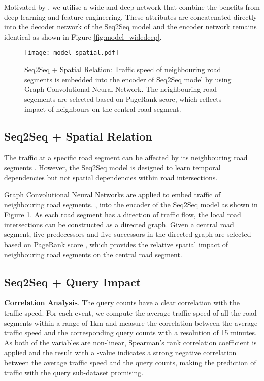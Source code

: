 Motivated by \cite{cheng2016wide}, we utilise a wide and deep network that combine the benefits from deep learning and feature engineering. These attributes  are concatenated directly into the decoder network of the Seq2Seq model and the encoder network remains identical as shown in Figure  \ref{fig:model_widedeep}.


\begin{figure}[htbp]
\centering
\texttt{[image: model\_spatial.pdf]}
\caption{Seq2Seq + Spatial Relation: Traffic speed of neighbouring road segments  is embedded into the encoder of Seq2Seq model by using Graph Convolutional Neural Network. The neighbouring road segements are selected based on PageRank score, which reflects impact of neighbours on the central road segment.}
\label{fig:model_spatial}
\end{figure}


\subsection{Seq2Seq + Spatial Relation}

The traffic at a specific road segment can be affected by its neighbouring road segments  \cite{yu2017spatio}. However, the Seq2Seq model is designed to learn temporal dependencies but not spatial dependencies within road intersections. 

Graph Convolutional Neural Networks \cite{niepert2016learning} are applied to embed traffic of neighbouring road segments, , into the encoder of the Seq2Seq model as shown in Figure \ref{fig:model_spatial}. As each road segment has a direction of traffic flow, the local road intersections can be constructed as a directed graph. Given a central road segment, five predecessors and five successors in the directed graph are selected based on PageRank score \cite{page1999pagerank}, which provides the relative spatial impact of neighbouring road segments on the central road segment.



\subsection{Seq2Seq + Query Impact}

\textbf{Correlation Analysis}. The query counts have a clear correlation with the traffic speed. For each event, we compute the average traffic speed of all the road segments within a range of 1km and measure the correlation between the average traffic speed and the corresponding query counts with a resolution of 15 minutes. As both of the variables are non-linear, Spearman's rank correlation coefficient is applied and the result  with a -value indicates a strong negative correlation between the average traffic speed and the query counts, making the prediction of traffic with the query sub-dataset promising.

